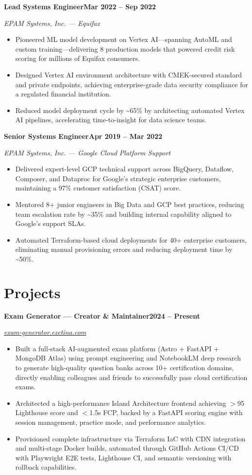\documentclass[11pt,letterpaper]{article}
\newcommand{\job}[3]{%
  \par\vspace{4pt}%
  \noindent\textbf{#1}\hfill\textbf{#3}%
  \par\vspace{1pt}\noindent\textit{#2}%
  \par\vspace{1pt}%
}
\begin{document}
\job{Lead Systems Engineer}{EPAM Systems, Inc. --- Equifax}{Mar 2022 -- Sep 2022}
\begin{itemize}
    \item Pioneered ML model development on Vertex AI---spanning AutoML and custom training---delivering 8 production models that powered credit risk scoring for millions of Equifax consumers.
    \item Designed Vertex AI environment architecture with CMEK-secured standard and private endpoints, achieving enterprise-grade data security compliance for a regulated financial institution.
    \item Reduced model deployment cycle by \textasciitilde{}65\% by architecting automated Vertex AI pipelines, accelerating time-to-insight for data science teams.
\end{itemize}

\job{Senior Systems Engineer}{EPAM Systems, Inc. --- Google Cloud Platform Support}{Apr 2019 -- Mar 2022}
\begin{itemize}
    \item Delivered expert-level GCP technical support across BigQuery, Dataflow, Composer, and Dataproc for Google's strategic enterprise customers, maintaining a 97\% customer satisfaction (CSAT) score.
    \item Mentored 8+ junior engineers in Big Data and GCP best practices, reducing team escalation rate by \textasciitilde{}35\% and building internal capability aligned to Google's support SLAs.
    \item Automated Terraform-based cloud deployments for 40+ enterprise customers, eliminating manual provisioning errors and reducing deployment time by \textasciitilde{}50\%.
\end{itemize}

\section{Projects}

\job{Exam Generator --- Creator \& Maintainer}{\href{https://exam-generator.ezetina.com/exams}{exam-generator.ezetina.com}}{2024 -- Present}
\begin{itemize}
    \item Built a full-stack AI-augmented exam platform (Astro + FastAPI + MongoDB Atlas) using prompt engineering and NotebookLM deep research to generate high-quality question banks across 10+ certification domains, directly enabling colleagues and friends to successfully pass cloud certification exams.
    \item Architected a high-performance Island Architecture frontend achieving $>$95 Lighthouse score and $<$1.5s FCP, backed by a FastAPI scoring engine with session management, practice mode, and performance analytics.
    \item Provisioned complete infrastructure via Terraform IaC with CDN integration and multi-stage Docker builds, automated through GitHub Actions CI/CD with Playwright E2E tests, Lighthouse CI, and semantic versioning with rollback capabilities.
\end{itemize}
\end{document}
